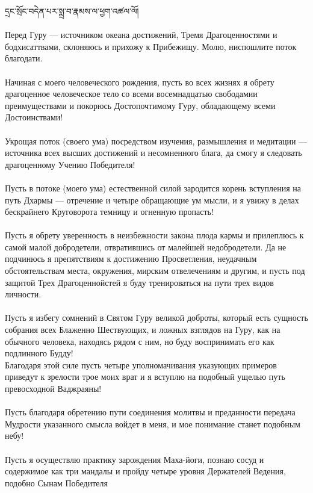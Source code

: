 དྲང་སྲོང་བདེན་པར་སྨྲ་བ་རྣམས་ལ་ཕྱག་འཚལ་ལོ།\\
\\
\ru
Перед Гуру — источником океана достижений,
Тремя Драгоце\-нностями и бодхисаттвами,
склоняюсь и прихожу к Прибежищу.
Молю, ниспошлите поток благодати.\\
\\
Начиная с моего человеческого рождения,
пусть во всех жизнях я обрету драгоценное человеческое тело
со всеми восемнадцатью свободамии преимуществами
и покорюсь Дос\-топочтимому Гуру,
обладающему всеми Достоинствами!\\
\\
Укрощая поток (своего ума) посредством изучения,
размышле\-ния и медитации — источника всех
высших достижений и несомненного блага,
да смогу я следовать драгоценному Учению Победителя!\\
\\
Пусть в потоке (моего ума) естественной силой
зародится корень вступления на путь Дхармы —
отречение и четыре обращающие ум мысли,
и я увижу в делах бескрайнего Круго\-ворота
темницу и огненную пропасть!\\
\\
Пусть я обрету уверенность в неизбежности закона плода кармы
и прилеплюсь к самой малой добродетели,
отвратившись от малейшей недобродетели.
Да не подчинюсь я препятствиям к достижению Просветления,
неудачным обстоятельствам места, окружения,
мирским отвелечениям и другим, и пусть под защитой
Трех Драгоценнойстей я буду тренироваться на пути трех видов личности.\\
\\
Пусть я избегу сомнений в Святом Гуру великой доброты,
который есть сущность собрания всех Блаженно Шествующих,
и ложных взглядов на Гуру, как на обычного человека,
находясь рядом с ним, но буду воспринимать его как подлинного Будду!
\\
Благодаря этой силе пусть четыре уполномачивания
указующих примеров приведут к зрелости трое моих врат
и я вступлю на подобный ущелью путь превосходной Ваджраяны!\\
\\
Пусть благодаря обретению пути соединения молитвы и преда\-нности
передача Мудрости указанного смысла войдет в меня,
и мое понимание станет подобным небу!\\
\\
Пусть я осуществлю практику зарождения Маха-йоги,
познаю сосуд и содержимое как три мандалы и пройду четыре
уровня Держателей Ведения, подобно Сынам Победителя
